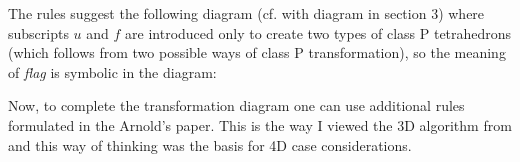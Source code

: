 \documentclass[a4paper,12pt]{amsart}
\numberwithin{equation}{section}
\begin{document}
The rules suggest the following diagram (cf. with diagram in section 3) where subscripts $u$ and $f$ are introduced only to create two types of class P tetrahedrons (which follows from two possible ways of class P transformation), so the meaning of \textit{flag} is symbolic in the diagram:

\begin{center}
\end{center}

Now, to complete the transformation diagram one can use additional rules formulated in the Arnold's paper. This is the way I viewed the 3D algorithm from \cite{arnold} and this way of thinking was the basis for 4D case considerations.
\end{document}
